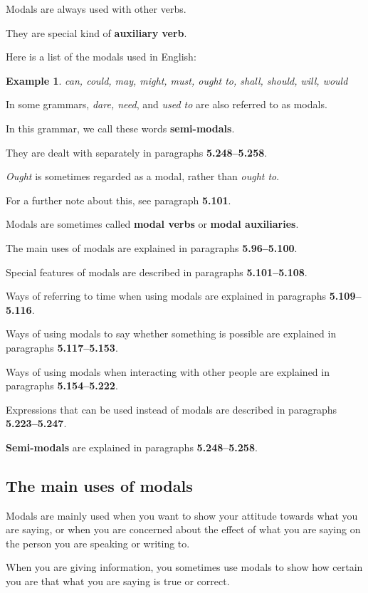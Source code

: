 \documentclass[oneside]{book}
\numberwithin{equation}{section}
\newtheorem{example}{Example}[section]
\begin{document}
Modals are always used with other verbs.

They are special kind of \textbf{auxiliary verb}.

%
Here is a list of the modals used in English:
\begin{example}
    can, could, may, might, must, ought to, shall, should, will, would
\end{example}
In some grammars, \textit{dare, need}, and \textit{used to} are also referred to as modals.

In this grammar, we call these words \textbf{semi-modals}.

They are dealt with separately in paragraphs \textbf{5.248--5.258}.

%
\textit{Ought} is sometimes regarded as a modal, rather than \textit{ought to}.

For a further note about this, see paragraph \textbf{5.101}.

%
Modals are sometimes called \textbf{modal verbs} or \textbf{modal auxiliaries}.

%
\noindent{} The main uses of modals are explained in paragraphs \textbf{5.96--5.100}.

Special features of modals are described in paragraphs \textbf{5.101--5.108}.

%
Ways of referring to time when using modals are explained in paragraphs \textbf{5.109--5.116}.

Ways of using modals to say whether something is possible are explained in paragraphs \textbf{5.117--5.153}.

Ways of using modals when interacting with other people are explained in paragraphs \textbf{5.154--5.222}.

%
Expressions that can be used instead of modals are described in paragraphs \textbf{5.223--5.247}.

\textbf{Semi-modals} are explained in paragraphs \textbf{5.248--5.258}.

\subsection{The main uses of modals}
\noindent{} Modals are mainly used when you want to show your attitude towards what you are saying, or when you are concerned about the effect of what you are saying on the person you are speaking or writing to.

%
\noindent{} When you are giving information, you sometimes use modals to show how certain you are that what you are saying is true or correct.
\end{document}
